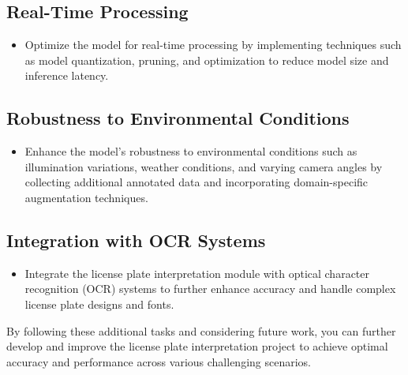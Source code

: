 	\subsection*{Real-Time Processing}
	\begin{itemize}
		\item Optimize the model for real-time processing by implementing techniques such as model quantization, pruning, and optimization to reduce model size and inference latency.
	\end{itemize}
	
	\subsection*{Robustness to Environmental Conditions}
	\begin{itemize}
		\item Enhance the model's robustness to environmental conditions such as illumination variations, weather conditions, and varying camera angles by collecting additional annotated data and incorporating domain-specific augmentation techniques.
	\end{itemize}
	
	\subsection*{Integration with OCR Systems}
	\begin{itemize}
		\item Integrate the license plate interpretation module with optical character recognition (OCR) systems to further enhance accuracy and handle complex license plate designs and fonts.
	\end{itemize}
	
	By following these additional tasks and considering future work, you can further develop and improve the license plate interpretation project to achieve optimal accuracy and performance across various challenging scenarios.
	



